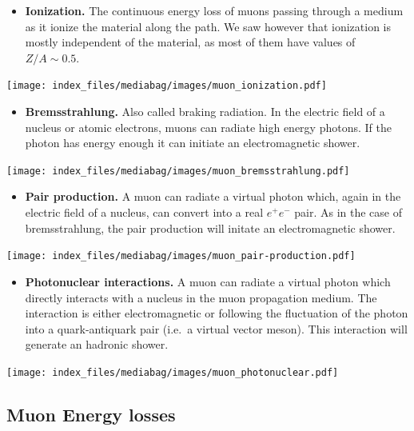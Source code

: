 \documentclass[
  letterpaper,
  DIV=11,
  numbers=noendperiod]{scrreprt}
\providecommand{\tightlist}{%
  \setlength{\itemsep}{0pt}\setlength{\parskip}{0pt}}\usepackage{longtable,booktabs,array}
\begin{document}
\begin{itemize}
\tightlist
\item
  \textbf{Ionization.} The continuous energy loss of muons passing
  through a medium as it ionize the material along the path. We saw
  however that ionization is mostly independent of the material, as most
  of them have values of \(Z/A \sim 0.5\).
\end{itemize}

\texttt{[image: index\_files/mediabag/images/muon\_ionization.pdf]}

\begin{itemize}
\tightlist
\item
  \textbf{Bremsstrahlung.} Also called braking radiation. In the
  electric field of a nucleus or atomic electrons, muons can radiate
  high energy photons. If the photon has energy enough it can initiate
  an electromagnetic shower.
\end{itemize}

\texttt{[image: index\_files/mediabag/images/muon\_bremsstrahlung.pdf]}

\begin{itemize}
\tightlist
\item
  \textbf{Pair production.} A muon can radiate a virtual photon which,
  again in the electric field of a nucleus, can convert into a real
  \(e^+e^-\) pair. As in the case of bremsstrahlung, the pair production
  will initate an electromagnetic shower.
\end{itemize}

\texttt{[image: index\_files/mediabag/images/muon\_pair-production.pdf]}

\begin{itemize}
\tightlist
\item
  \textbf{Photonuclear interactions.} A muon can radiate a virtual
  photon which directly interacts with a nucleus in the muon propagation
  medium. The interaction is either electromagnetic or following the
  fluctuation of the photon into a quark-antiquark pair (i.e.~a virtual
  vector meson). This interaction will generate an hadronic shower.
\end{itemize}

\texttt{[image: index\_files/mediabag/images/muon\_photonuclear.pdf]}

\subsection*{Muon Energy losses}\label{muon-energy-losses}
\end{document}
